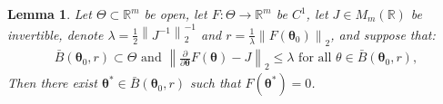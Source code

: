 \documentclass[12pt]{article} %
\newcommand{\bs}{\boldsymbol}
\newtheorem{lemma}{Lemma}
\theoremstyle{definition}
\begin{document}
\begin{lemma}\label{clemma} Let $\Theta\subset \mathbb{R}^m$ be open, let $F:\Theta\to \mathbb{R}^m$ be $C^1$, let $J\in  M_m(\mathbb{R})$ be invertible, denote $\lambda = \frac{1}{2} \left\|J^{-1}\right\|_2^{-1}$ and $r=\frac{1}{\lambda}\left\|F(\bs{\theta}_0)\right\|_2$, and suppose that:
\begin{equation*}
\begin{aligned}\bar{B}(\bs{\theta}_0,r)\subset \Theta\mbox{ and }
\left\|\frac{\partial}{\partial \bs{\theta}} F(\bs{\theta})-J\right\|_2\leq \lambda \mbox{ for all }\theta\in \bar{B}(\bs{\theta}_0,r),
\end{aligned}
\end{equation*}
Then there exist $\bs{\theta}^*\in \bar{B}(\bs{\theta}_0,r)$ such that $F(\bs{\theta}^*)=0$.
\end{lemma}
\end{document}
